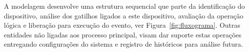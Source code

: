 A modelagem desenvolve uma estrutura sequencial que parte da identificação do dispositivo, análise dos gatilhos ligados a este dispositivo, avaliação da operação lógica e liberação para execução do evento, ver Figura~\ref{fig:fluxograma}. Outras entidades não ligadas aos processo principal, visam dar suporte estas operações entregando configurações do sistema e registro de históricos para análise futura. 